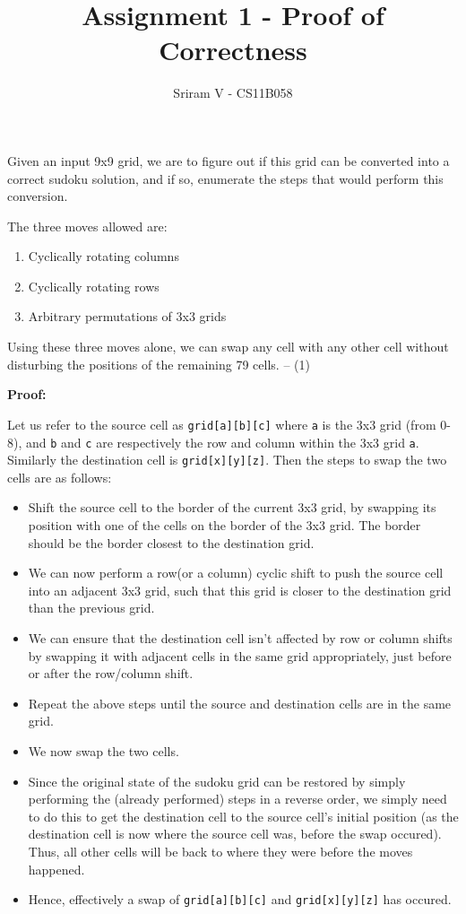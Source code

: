 \documentclass{article}
\title{Assignment 1 - Proof of Correctness}
\author{Sriram V - CS11B058}
\date{}
\begin{document}
\maketitle


\bigskip
Given an input 9x9 grid, we are to figure out if this grid can be converted into a correct sudoku solution, and if so, enumerate the steps that would perform this conversion.

The three moves allowed are:
\begin{enumerate}
\item Cyclically rotating columns
\item Cyclically rotating rows
\item Arbitrary permutations of 3x3 grids
\end{enumerate}

\bigskip
Using these three moves alone, we can swap any cell with any other cell without disturbing the positions of the remaining 79 cells. -- (1)

\bigskip
\textbf{Proof:}

Let us refer to the source cell as \texttt{grid[a][b][c]} where \texttt{a} is the 3x3 grid (from 0-8), and \texttt{b} and \texttt{c} are respectively the row and column within the 3x3 grid \texttt{a}. Similarly the destination cell is \texttt{grid[x][y][z]}. Then the steps to swap the two cells are as follows:

\begin{itemize}
\item Shift the source cell to the border of the current 3x3 grid, by swapping its position with one of the cells on the border of the 3x3 grid. The border should be the border closest to the destination grid.
\item We can now perform a row(or a column) cyclic shift to push the source cell into an adjacent 3x3 grid, such that this grid is closer to the destination grid than the previous grid.
\item We can ensure that the destination cell isn't affected by row or column shifts by swapping it with adjacent cells in the same grid appropriately, just before or after the row/column shift.
\item Repeat the above steps until the source and destination cells are in the same grid. 
\item We now swap the two cells.
\item Since the original state of the sudoku grid can be restored by simply performing the (already performed) steps in a reverse order, we simply need to do this to get the destination cell to the source cell's initial position (as the destination cell is now where the source cell was, before the swap occured). Thus, all other cells will be back to where they were before the moves happened.
\item Hence, effectively a swap of \texttt{grid[a][b][c]} and \texttt{grid[x][y][z]} has occured.
\end{itemize}
\end{document}
